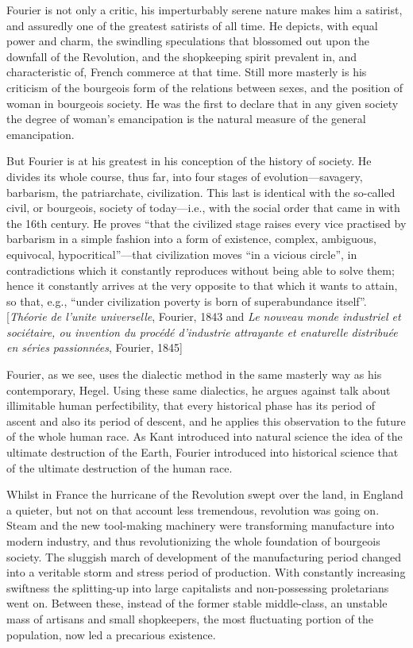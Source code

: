 Fourier is not only a critic, his imperturbably serene nature makes him a
satirist, and assuredly one of the greatest satirists of all time. He depicts,
with equal power and charm, the swindling speculations that blossomed out upon
the downfall of the Revolution, and the shopkeeping spirit prevalent in, and
characteristic of, French commerce at that time. Still more masterly is his
criticism of the bourgeois form of the relations between sexes, and the position
of woman in bourgeois society. He was the first to declare that in any given
society the degree of woman’s emancipation is the natural measure of the general
emancipation. 

But Fourier is at his greatest in his conception of the history of society. He
divides its whole course, thus far, into four stages of evolution---savagery,
barbarism, the patriarchate, civilization. This last is identical with the
so-called civil, or bourgeois, society of today---i.e., with the social order
that came in with the 16th century. He proves ``that the civilized stage raises
every vice practised by barbarism in a simple fashion into a form of existence,
complex, ambiguous, equivocal, hypocritical''---that civilization moves ``in a
vicious circle'', in contradictions which it constantly reproduces without being
able to solve them; hence it constantly arrives at the very opposite to that
which it wants to attain, so that, e.g., ``under civilization poverty is born of
superabundance itself''. [\emph{Théorie de l’unite universelle}, Fourier, 1843
and \emph{Le nouveau monde industriel et sociétaire, ou invention du procédé
d'industrie attrayante et enaturelle distribuée en séries passionnées}, Fourier,
1845]

Fourier, as we see, uses the dialectic method in the same masterly way as his
contemporary, Hegel. Using these same dialectics, he argues against talk about
illimitable human perfectibility, that every historical phase has its period of
ascent and also its period of descent, and he applies this observation to the
future of the whole human race. As Kant introduced into natural science the idea
of the ultimate destruction of the Earth, Fourier introduced into historical
science that of the ultimate destruction of the human race.

Whilst in France the hurricane of the Revolution swept over the land, in England
a quieter, but not on that account less tremendous, revolution was going on.
Steam and the new tool-making machinery were transforming manufacture into
modern industry, and thus revolutionizing the whole foundation of bourgeois
society. The sluggish march of development of the manufacturing period changed
into a veritable storm and stress period of production. With constantly
increasing swiftness the splitting-up into large capitalists and non-possessing
proletarians went on. Between these, instead of the former stable middle-class,
an unstable mass of artisans and small shopkeepers, the most fluctuating portion
of the population, now led a precarious existence.

